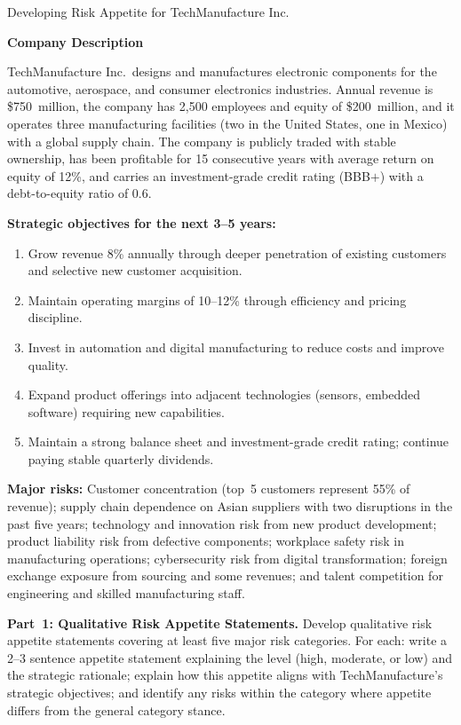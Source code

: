 \documentclass[11pt,openany]{book}
\providecommand{\tightlist}{\setlength{\itemsep}{0pt}\setlength{\parskip}{0pt}}
\begin{document}
\begin{minicase}{Developing Risk Appetite for TechManufacture Inc.}

\textbf{Company Description}

TechManufacture Inc.\ designs and manufactures electronic components for the
automotive, aerospace, and consumer electronics industries. Annual revenue is
\$750~million, the company has 2,500 employees and equity of \$200~million,
and it operates three manufacturing facilities (two in the United States, one
in Mexico) with a global supply chain. The company is publicly traded with
stable ownership, has been profitable for 15 consecutive years with average
return on equity of 12\%, and carries an investment-grade credit rating
(BBB$+$) with a debt-to-equity ratio of 0.6.

\medskip
\textbf{Strategic objectives for the next 3--5 years:}
\begin{enumerate}\tightlist
  \item Grow revenue 8\% annually through deeper penetration of existing
        customers and selective new customer acquisition.
  \item Maintain operating margins of 10--12\% through efficiency and pricing
        discipline.
  \item Invest in automation and digital manufacturing to reduce costs and
        improve quality.
  \item Expand product offerings into adjacent technologies (sensors, embedded
        software) requiring new capabilities.
  \item Maintain a strong balance sheet and investment-grade credit rating;
        continue paying stable quarterly dividends.
\end{enumerate}

\medskip
\textbf{Major risks:} Customer concentration (top~5 customers represent 55\%
of revenue); supply chain dependence on Asian suppliers with two disruptions in
the past five years; technology and innovation risk from new product development;
product liability risk from defective components; workplace safety risk in
manufacturing operations; cybersecurity risk from digital transformation;
foreign exchange exposure from sourcing and some revenues; and talent
competition for engineering and skilled manufacturing staff.

\medskip
\textbf{Part~1: Qualitative Risk Appetite Statements.} Develop qualitative
risk appetite statements covering at least five major risk categories. For
each: write a 2--3 sentence appetite statement explaining the level (high,
moderate, or low) and the strategic rationale; explain how this appetite aligns
with TechManufacture's strategic objectives; and identify any risks within the
category where appetite differs from the general category stance.


\end{minicase}
\end{document}

